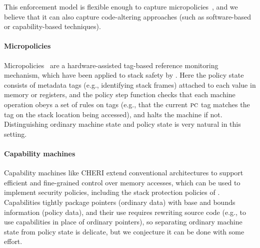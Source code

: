 \documentclass[acmsmall,review,anonymous]{acmart}\settopmatter{printfolios=true,printccs=false,printacmref=false}
\begin{document}

This enforcement model is flexible enough to capture
micropolicies~\citep{pump_oakland2015}, and we believe that it can
also capture code-altering approaches (such as software-based
or capability-based techniques).

\newcommand{\TAGS}{\mathcal{T}}
\newcommand{\tagname}{t}
\newcommand{\uP}{{\mu P}}

\paragraph*{Micropolicies}
%
Micropolicies~\citep{pump_oakland2015} are a hardware-assisted tag-based
reference monitoring mechanism, which have been applied to stack safety by
\citet{DBLP:conf/sp/RoesslerD18}.
Here the policy state consists of metadata tags (e.g., identifying stack frames)
attached to each value in memory or registers, and the policy step function
checks that each machine operation obeys a set of rules on tags
(e.g., that the current $\textsc{pc}$ tag matches the tag on the stack
location being accessed), and halts the machine if not.  Distinguishing
ordinary machine state and policy state is very natural in this setting.

\paragraph*{Capability machines}
%
Capability machines like CHERI \citep{Woodruff+14} extend conventional
architectures to support efficient and fine-grained control over memory
accesses, which can be used to implement security policies, including
the stack protection policies of
\citet{Skorstengaard+19,Skorstengaard+19b}.  Capabilities tightly package pointers
(ordinary data) with base and bounds information (policy data),
and their use requires rewriting source code (e.g., to use capabilities in place
of ordinary pointers), so separating ordinary machine state from policy
state is delicate, but we conjecture it can be done with some effort.
\end{document}
